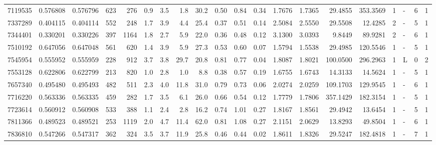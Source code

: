 \begin{center}
\begin{tabular}{rccrrccrrrrrrrrrrlrr}
   7119535 & 0.576808 & 0.576796 &  623 &  276 &      0.9 &      3.5 &     1.8 &    30.2 &   0.50 &   0.84 &       0.34 &  1.7676 &  1.7365 &   29.4855 &  353.3569 &       1 &             - &        6 &         1 \\
   7337289 & 0.404115 & 0.404114 &  552 &  248 &      1.7 &      3.9 &     4.4 &    25.4 &   0.37 &   0.51 &       0.14 &  2.5084 &  2.5550 &   29.5508 &   12.4285 &       2 &             - &        5 &         1 \\
   7344401 & 0.330201 & 0.330226 &  397 & 1164 &      1.8 &      2.7 &     5.9 &    22.0 &   0.36 &   0.48 &       0.12 &  3.1300 &  3.0393 &    9.8449 &   89.9281 &       2 &             - &        6 &         1 \\
   7510192 & 0.647056 & 0.647048 &  561 &  620 &      1.4 &      3.9 &     5.9 &    27.3 &   0.53 &   0.60 &       0.07 &  1.5794 &  1.5538 &   29.4985 &  120.5546 &       1 &             - &        5 &         1 \\
   7545954 & 0.555952 & 0.555959 &  228 &  912 &      3.7 &      3.8 &    29.7 &    20.8 &   0.81 &   0.77 &       0.04 &  1.8087 &  1.8021 &  100.0500 &  296.2963 &       1 &             L &        0 &         2 \\
   7553128 & 0.622806 & 0.622799 &  213 &  820 &      1.0 &      2.8 &     1.0 &     8.8 &   0.38 &   0.57 &       0.19 &  1.6755 &  1.6743 &   14.3133 &   14.5624 &       1 &             - &        5 &         1 \\
   7657340 & 0.495480 & 0.495493 &  482 &  511 &      2.3 &      4.0 &    11.8 &    31.0 &   0.79 &   0.73 &       0.06 &  2.0274 &  2.0259 &  109.1703 &  129.9545 &       1 &             - &        6 &         1 \\
   7716220 & 0.563336 & 0.563335 &  459 &  282 &      1.7 &      3.5 &     6.1 &    26.0 &   0.66 &   0.54 &       0.12 &  1.7779 &  1.7806 &  357.1429 &  182.3154 &       1 &             - &        5 &         1 \\
   7723614 & 0.560912 & 0.560908 &  533 &  388 &      1.1 &      2.4 &     2.8 &    16.2 &   0.74 &   1.01 &       0.27 &  1.8167 &  1.8561 &   29.4942 &   13.6454 &       1 &             - &        5 &         1 \\
   7811366 & 0.489523 & 0.489521 &  253 & 1119 &      2.0 &      4.7 &    11.4 &    62.0 &   0.81 &   1.08 &       0.27 &  2.1151 &  2.0629 &   13.8293 &   49.8504 &       1 &             - &        6 &         1 \\
   7836810 & 0.547266 & 0.547317 &  362 &  324 &      3.5 &      3.7 &    11.9 &    25.8 &   0.46 &   0.44 &       0.02 &  1.8611 &  1.8326 &   29.5247 &  182.4818 &       1 &             - &        7 &         1 \\

\end{tabular}
\end{center}

